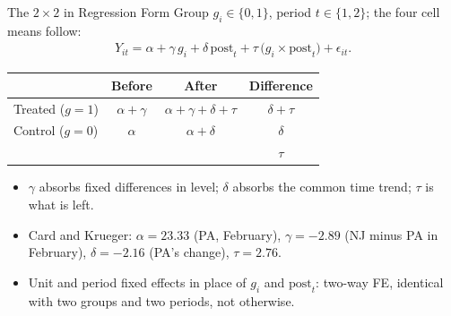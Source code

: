 \documentclass[aspectratio=169,11pt,xcolor=dvipsnames]{beamer}
\begin{document}
\begin{frame}{The $2\times2$ in Regression Form}
Group $g_i \in\{0,1\}$, period $t\in\{1,2\}$; the four cell means follow:
\begin{align*}
  Y_{it} = \alpha + \gamma\, g_i + \delta\, \text{post}_t
         + \tau\,\big(g_i \times \text{post}_t\big) + \epsilon_{it} .
\end{align*}
\vskip-4pt
\begin{center}\small
\renewcommand{\arraystretch}{1.1}
\begin{tabular}{lccc}
\toprule
 & Before & After & Difference \\
\midrule
Treated ($g=1$) & $\alpha+\gamma$ & $\alpha+\gamma+\delta+\tau$ & $\delta+\tau$ \\
Control ($g=0$) & $\alpha$ & $\alpha+\delta$ & $\delta$ \\
\midrule
 & & & $\tau$ \\
\bottomrule
\end{tabular}
\end{center}
\begin{itemize}\itemsep2pt
  \item $\gamma$ absorbs fixed differences in level; $\delta$ absorbs the common
        time trend; $\tau$ is what is left.
  \item Card and Krueger: $\alpha = 23.33$ (PA, February), $\gamma = -2.89$ (NJ minus PA
        in February), $\delta = -2.16$ (PA's change), $\tau = 2.76$.
  \item Unit and period fixed effects in place of $g_i$ and $\text{post}_t$: two-way FE,
        \alert{identical with two groups and two periods}, not otherwise.
\end{itemize}
\end{frame}
\end{document}
